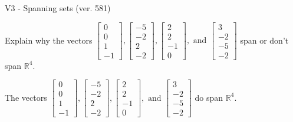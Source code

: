 \begin{exercise}
  \begin{exerciseTitle}V3 - Spanning sets (ver. 581)\end{exerciseTitle}
  \begin{exerciseStatement}
    Explain why the vectors \(\left[\begin{array}{r}
0 \\
0 \\
1 \\
-1
\end{array}\right] , \left[\begin{array}{r}
-5 \\
-2 \\
2 \\
-2
\end{array}\right] , \left[\begin{array}{r}
2 \\
2 \\
-1 \\
0
\end{array}\right] , \text{ and } \left[\begin{array}{r}
3 \\
-2 \\
-5 \\
-2
\end{array}\right]\) span or don't span \(\mathbb{R}^4\). 
	


  \end{exerciseStatement}
  \begin{exerciseAnswer}
   The vectors \(\left[\begin{array}{r}
0 \\
0 \\
1 \\
-1
\end{array}\right] , \left[\begin{array}{r}
-5 \\
-2 \\
2 \\
-2
\end{array}\right] , \left[\begin{array}{r}
2 \\
2 \\
-1 \\
0
\end{array}\right] , \text{ and } \left[\begin{array}{r}
3 \\
-2 \\
-5 \\
-2
\end{array}\right]\) 
  	 do  
	span \(\mathbb{R}^4\).
  


  \end{exerciseAnswer}
\end{exercise}